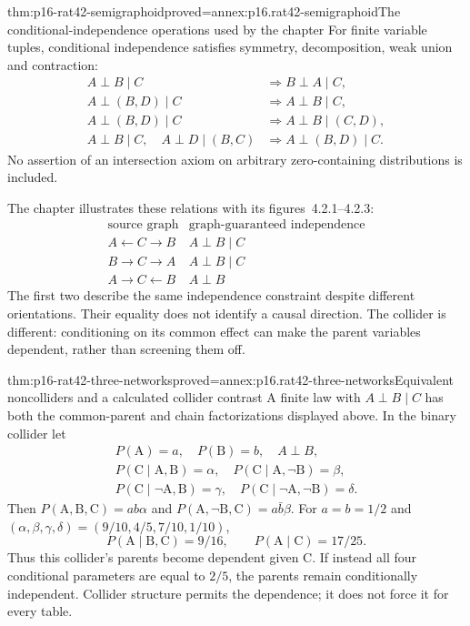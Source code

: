 \begin{hblemma}{thm:p16-rat42-semigraphoid}{proved=annex:p16.rat42-semigraphoid}{The conditional-independence operations used by the chapter}
For finite variable tuples, conditional independence satisfies symmetry,
decomposition, weak union and contraction:
\[
\begin{aligned}
 A\perp B\mid C&\Longrightarrow B\perp A\mid C,\\
 A\perp(B,D)\mid C&\Longrightarrow A\perp B\mid C,\\
 A\perp(B,D)\mid C&\Longrightarrow A\perp B\mid(C,D),\\
 A\perp B\mid C,\quad A\perp D\mid(B,C)
     &\Longrightarrow A\perp(B,D)\mid C.
\end{aligned}
\]
No assertion of an intersection axiom on arbitrary zero-containing
distributions is included.
\end{hblemma}

The chapter illustrates these relations with its figures~4.2.1--4.2.3:
\[
 \begin{array}{c|c}
  \text{source graph}&\text{graph-guaranteed independence}\\\hline
  A\leftarrow C\to B&A\perp B\mid C\\
  B\to C\to A&A\perp B\mid C\\
  A\to C\leftarrow B&A\perp B
 \end{array}
\]
The first two describe the same independence constraint despite different
orientations. Their equality does not identify a causal direction.
The collider is different: conditioning on its common effect can make
the parent variables dependent, rather than screening them off.

\begin{hbtheorem}{thm:p16-rat42-three-networks}{proved=annex:p16.rat42-three-networks}{Equivalent noncolliders and a calculated collider contrast}
A finite law with \(A\perp B\mid C\) has both the common-parent
and chain factorizations displayed above. In the binary collider let
\[
\begin{gathered}
 P(\mathrm A)=a,\quad P(\mathrm B)=b,\quad A\perp B,\\
 P(\mathrm C\mid\mathrm A,\mathrm B)=\alpha,\quad
 P(\mathrm C\mid\mathrm A,\neg\mathrm B)=\beta,\\
 P(\mathrm C\mid\neg\mathrm A,\mathrm B)=\gamma,\quad
 P(\mathrm C\mid\neg\mathrm A,\neg\mathrm B)=\delta.
\end{gathered}
\]
Then \(P(\mathrm A,\mathrm B,\mathrm C)=ab\alpha\) and
\(P(\mathrm A,\neg\mathrm B,\mathrm C)=a\bar b\beta\).
For \(a=b=1/2\) and
\((\alpha,\beta,\gamma,\delta)=(9/10,4/5,7/10,1/10)\),
\[
 P(\mathrm A\mid\mathrm B,\mathrm C)=9/16,
 \qquad P(\mathrm A\mid\mathrm C)=17/25.
\]
Thus this collider's parents become dependent given \(\mathrm C\).
If instead all four conditional parameters are equal to \(2/5\),
the parents remain conditionally independent. Collider structure
permits the dependence; it does not force it for every table.
\end{hbtheorem}

